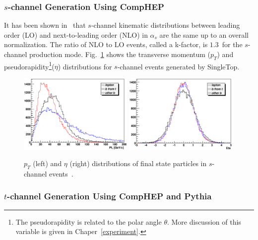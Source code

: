 \subsubsection{$s$-channel Generation Using CompHEP}
\label{schannelgen}

It has been shown in~\cite{Sullivan:2004ie} that $s$-channel kinematic distributions between leading order (LO) and next-to-leading order (NLO) in $\alpha_{s}$ are the same up to an overall normalization. The ratio of NLO to LO events, called a k-factor, is $1.3$~for the $s$-channel production mode. Fig.~\ref{schannelevents} shows the transverse momentum ($p_{T}$) and pseudorapidity\footnote{The pseudorapidity is related to the polar angle $\theta$. More discussion of this variable is given in Chaper~\ref{experiment}.}($\eta$) distributions for $s$-channel events generated by SingleTop.


\begin{figure}[!h!tbp]
\begin{center}
\includegraphics[width=0.49\textwidth]{eps/Theory/Hist_tb_Pt.eps}
\includegraphics[width=0.49\textwidth]{eps/Theory/Hist_tb_Eta.eps}
\end{center}
\vspace{-0.1in}
\caption{$p_{T}$ (left) and $\eta$ (right) distributions of final state particles in $s$-channel events~\cite{Jabeen:2006km}.}
\label{schannelevents}
\end{figure}


\subsubsection{$t$-channel Generation Using CompHEP and Pythia}
\label{tchannelgen}

